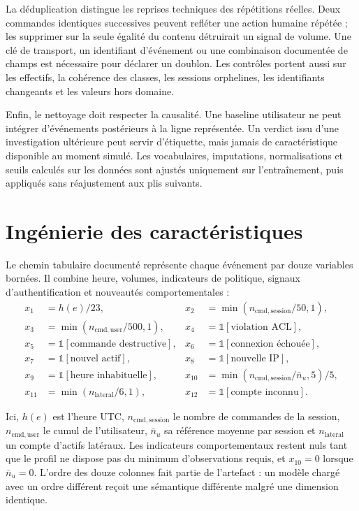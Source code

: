 \documentclass[11pt,a4paper,oneside]{report}
\theoremstyle{definition}
\theoremstyle{plain}
\begin{document}
La déduplication distingue les reprises techniques des répétitions réelles. Deux
commandes identiques successives peuvent refléter une action humaine répétée ;
les supprimer sur la seule égalité du contenu détruirait un signal de volume.
Une clé de transport, un identifiant d'événement ou une combinaison documentée
de champs est nécessaire pour déclarer un doublon. Les contrôles portent aussi
sur les effectifs, la cohérence des classes, les sessions orphelines, les
identifiants changeants et les valeurs hors domaine.

Enfin, le nettoyage doit respecter la causalité. Une baseline utilisateur ne
peut intégrer d'événements postérieurs à la ligne représentée. Un verdict issu
d'une investigation ultérieure peut servir d'étiquette, mais jamais de
caractéristique disponible au moment simulé. Les vocabulaires, imputations,
normalisations et seuils calculés sur les données sont ajustés uniquement sur
l'entraînement, puis appliqués sans réajustement aux plis suivants.

\section{Ingénierie des caractéristiques}

Le chemin tabulaire documenté représente chaque événement par douze variables
bornées. Il combine heure, volumes, indicateurs de politique, signaux
d'authentification et nouveautés comportementales :
\begin{align}
x_1&=h(e)/23, &
x_2&=\min(n_{\mathrm{cmd,session}}/50,1),\nonumber\\
x_3&=\min(n_{\mathrm{cmd,user}}/500,1),&
x_4&=\mathbb{1}[\text{violation ACL}],\nonumber\\
x_5&=\mathbb{1}[\text{commande destructive}],&
x_6&=\mathbb{1}[\text{connexion échouée}],\nonumber\\
x_7&=\mathbb{1}[\text{nouvel actif}],&
x_8&=\mathbb{1}[\text{nouvelle IP}],\nonumber\\
x_9&=\mathbb{1}[\text{heure inhabituelle}],&
x_{10}&=\min(n_{\mathrm{cmd,session}}/\bar n_u,5)/5,\nonumber\\
x_{11}&=\min(n_{\mathrm{lateral}}/6,1),&
x_{12}&=\mathbb{1}[\text{compte inconnu}].
\label{eq:method-features}
\end{align}

Ici, $h(e)$ est l'heure UTC, $n_{\mathrm{cmd,session}}$ le nombre de commandes
de la session, $n_{\mathrm{cmd,user}}$ le cumul de l'utilisateur, $\bar n_u$ sa
référence moyenne par session et $n_{\mathrm{lateral}}$ un compte d'actifs
latéraux. Les indicateurs comportementaux restent nuls tant que le profil ne
dispose pas du minimum d'observations requis, et $x_{10}=0$ lorsque
$\bar n_u=0$. L'ordre des douze colonnes fait partie de l'artefact : un modèle
chargé avec un ordre différent reçoit une sémantique différente malgré une
dimension identique.
\end{document}
